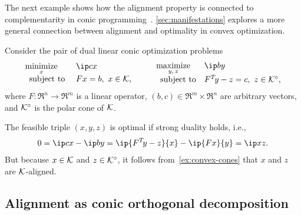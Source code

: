 The next example shows how the alignment property is connected to
complementarity in conic programming~\cite[Section 5.3.6]{bertsekas2009convex}.
\autoref{sec:manifestations} explores a more general connection between alignment
and optimality in convex optimization.

\begin{example} \label{example-conic-opt}

  Consider the pair of dual linear conic optimization problems
      \begin{equation*}
        \begin{array}{l@{\enspace\ }l}
          \minimize{x} & \ip c x \\ 
          \st          & Fx = b,\  x\in \Kscr,
        \end{array}
        \qquad
        \begin{array}{l@{\enspace}l}
          \maximize{y,\,z} & \ip b y\\ 
          \st            & F\T y - z = c, \ z\in \Kscr\polar,
        \end{array}
      \end{equation*}
      where $F:\Re^n\to\Re^m$ is a linear operator,
      $(b,c)\in\Re^m\times\Re^n$ are arbitrary vectors, and
      $\mathcal{K}^\circ$ is the polar cone of $\mathcal{K}$.
      
  
      The feasible triple $(x,y,z)$ is optimal if strong
      duality holds, i.e.,
      \begin{align*}
        0 = \ip c x - \ip b y = \ip{F\T y-z}{x} - \ip{Fx}{y} = \ip x z.
      \end{align*}
      But because $x\in\mathcal{K}$ and $z\in\mathcal{K}^\circ$, it follows
      from~\autoref{ex:convex-cones} that $x$ and $z$ are $\mathcal{K}$-aligned.
  \end{example}


\subsection{Alignment as conic orthogonal decomposition}

